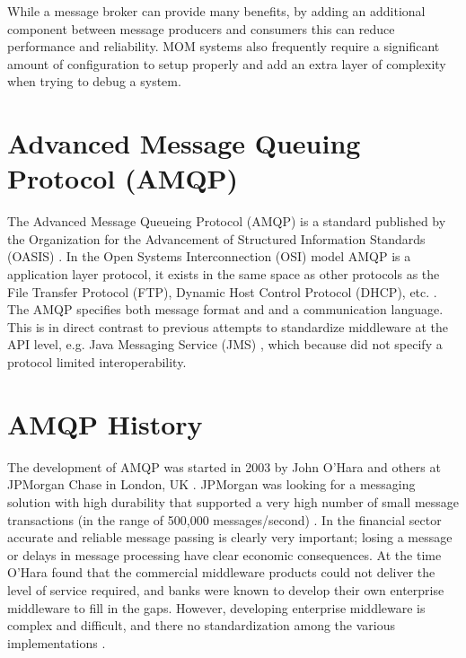 \documentclass{thesis}
\begin{document}
While a message broker can provide many benefits, by adding an additional component between message producers and consumers this can reduce performance and reliability.  MOM systems also frequently require a significant amount of configuration to setup properly and add an extra layer of complexity when trying to debug a system.
 

\section{Advanced Message Queuing Protocol (AMQP)}
The Advanced Message Queueing Protocol (AMQP) is a standard published by the Organization for the Advancement of Structured Information Standards (OASIS) \cite{OASIS}.  In the Open Systems Interconnection (OSI) model AMQP is a application layer protocol, it exists in the same space as other protocols as the File Transfer Protocol (FTP), Dynamic Host Control Protocol (DHCP), etc.  \cite{o2007toward}.  The AMQP specifies both message format and and a communication language.  This is in direct contrast to previous attempts to standardize middleware at the API level, e.g. Java Messaging Service (JMS) \cite{ORACLE_JMS}, which because did not specify a protocol limited interoperability. 

\section{AMQP History}
The development of AMQP was started in 2003 by John O'Hara and others at JPMorgan Chase in London, UK \cite{o2007toward}.  JPMorgan was looking for a messaging solution with high durability that supported a very high number of small message transactions (in the range of 500,000 messages/second) \cite{kramer2009advanced}.  In the financial sector accurate and reliable message passing is clearly very important; losing a message or delays in message processing have clear economic consequences.  At the time O'Hara found that the commercial middleware products could not deliver the level of service required, and banks were known to develop their own enterprise middleware to fill in the gaps. However, developing enterprise middleware is complex and difficult, and there no standardization among the various implementations \cite{kramer2009advanced}.
\end{document}
